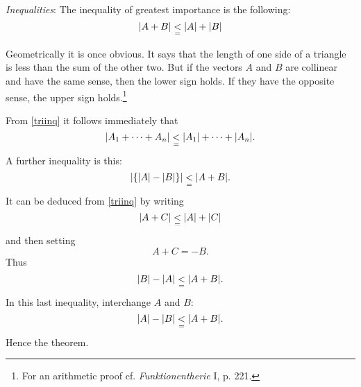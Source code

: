 \documentclass[letter,oneside]{memoir}
\begin{document}
\emph{Inequalities}: The inequality of greatest importance is the following:
\begin{equation}\label{triinq}
	\abs*{A+B} \underset{=}{<} \abs*{A} +\abs*{B} 
\end{equation} 


\begin{wrapfigure}{R}{0.2\textwidth}
\centering
{}
\end{wrapfigure}
Geometrically it is once obvious. It says that the length of one side of a triangle is less than the sum of the other two. But if the vectors $A$ and $B$ are collinear and have the same sense, then the lower sign holds. If they have the opposite sense, the upper sign holds.\footnote{For an arithmetic proof cf. \emph{Funktionentherie} I, p. 221.}

From \ref{triinq} it follows immediately that
\begin{equation}
	\abs*{A_1+\dots +A_n} \underset{=}{<}\abs*{A_1} +\dots +\abs*{A_n}.
\end{equation}
A further inequality is this:
\[
	\abs*{\cbr*{\abs*{A} -\abs*{B} } } \underset{=}{<}\abs*{A+B} 
.\] It can be deduced from \ref{triinq} by writing
\[
	\abs*{A+C} \underset{=}{<} \abs*{A} +\abs*{C} 
\] and then setting
\[
A+C=-B
.\] Thus
\[
	\abs*{B} -\abs*{A} \underset{=}{<} \abs*{A+B} 
.\] In this last inequality, interchange $A$ and $B$:
\[
	\abs*{A} -\abs*{B} \underset{=}{<} \abs*{A+B} 
.\] Hence the theorem.
\end{document}
